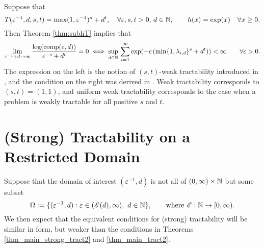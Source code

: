 \documentclass[sort&compress]{elsarticle}
\newcommand{\theM}{\mathscr{E}}
\begin{document}
\begin{example}
	Suppose that
	\[
	T(\varepsilon^{-1},d,s,t) = \max(1,\varepsilon^{-1})^s + d^t, \quad \forall \varepsilon,s,t > 0, \, d \in \mathbb{N}, \qquad h(x) = \exp(x) \quad \forall x \ge 0.
	\]
	Then Theorem \ref{thm:subhT} implies that
	\[\lim_{\varepsilon^{-1}+d\rightarrow \infty} \frac{\log( \operatorname{comp}(\varepsilon,d))}{\varepsilon^{-s}+d^t} = 0
	\iff
	 \sup_{d\in\mathbb{N}}  \, \sum_{i=1}^\infty \exp(-c\, (\min\{1,\lambda_{i,d}\}^{s} + d^t )) <\infty \qquad \forall c > 0.
	\]
	The expression on the left is the notion of $(s,t)$-weak tractability introduced in \cite{SW15}, and the condition on the right was derived in \cite[Theorem 3.1]{WW17}.  Weak tractability corresponds to $(s,t)=(1,1)$, and uniform weak tractability corresponds to the case when a problem is weakly tractable for all positive $s$ and $t$.
\end{example}

\section{(Strong) Tractability on a Restricted Domain} \label{sec:restricted}

Suppose that the domain of interest $(\varepsilon^{-1},d)$ is not all of $(0,\infty) \times \mathbb{N}$ but some subset
\begin{equation}
    \Omega  := \{(\varepsilon^{-1},d) : \varepsilon \in (\theM(d),\infty), \ d \in \naturals \}, \qquad \text{where }\theM : \naturals \to [0,\infty).
\end{equation}
We then expect that the equivalent conditions for (strong) tractability will be similar in form, but weaker than the conditions in Theorems  \ref{thm_main_strong_tract2} and \ref{thm_main_tract2}.
\end{document}
